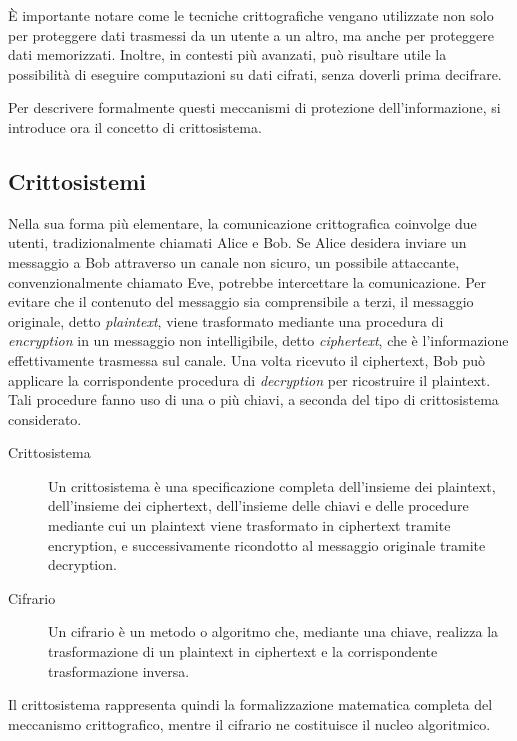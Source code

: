 È importante notare come le tecniche crittografiche vengano utilizzate
non solo per proteggere dati trasmessi da un utente a un altro, ma anche
per proteggere dati memorizzati. Inoltre, in contesti più avanzati, può
risultare utile la possibilità di eseguire computazioni su dati cifrati,
senza doverli prima decifrare.

Per descrivere formalmente questi meccanismi di protezione dell'informazione, si introduce ora il concetto di
crittosistema.

\subsection{Crittosistemi}

Nella sua forma più elementare, la comunicazione crittografica coinvolge due utenti, tradizionalmente chiamati Alice e
Bob. Se Alice desidera inviare un messaggio a Bob attraverso un canale non sicuro, un possibile attaccante,
convenzionalmente chiamato Eve, potrebbe intercettare la comunicazione. Per evitare che il contenuto del messaggio sia
comprensibile a terzi, il messaggio originale, detto \emph{plaintext}, viene trasformato mediante una procedura di
\emph{encryption} in un messaggio non intelligibile, detto \emph{ciphertext}, che è l'informazione effettivamente
trasmessa sul canale. Una volta ricevuto il ciphertext, Bob può applicare la corrispondente procedura di
\emph{decryption} per ricostruire il plaintext. Tali procedure fanno uso di una o più chiavi, a seconda del tipo di
crittosistema considerato.

\begin{description}
  \item[Crittosistema] Un crittosistema è una specificazione completa dell'insieme dei plaintext, dell'insieme dei
    ciphertext, dell'insieme delle chiavi e delle procedure mediante cui un plaintext viene trasformato in ciphertext
    tramite encryption, e successivamente ricondotto al messaggio originale tramite decryption.
\end{description}

\begin{description}
  \item[Cifrario] Un cifrario è un metodo o algoritmo che, mediante una chiave, realizza la trasformazione di un
    plaintext in ciphertext e la corrispondente trasformazione inversa.
\end{description}

Il crittosistema rappresenta quindi la formalizzazione matematica completa del meccanismo crittografico, mentre il
cifrario ne costituisce il nucleo algoritmico.


